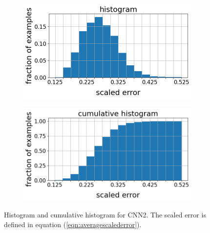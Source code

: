 \documentclass[12pt]{article}
\newcommand{\nhghistowidth}{0.48\linewidth}
\newcommand{\nhghistoheight}{4cm}
\begin{document}
\begin{figure}[!h]
\captionsetup[subfigure]{justification=centering}
  \centering
  \begin{subfigure}[c]{\nhghistowidth}
    \centering
    \includegraphics[totalheight=\nhghistoheight]{Figures/Results2New/histogram_new.png}
  \end{subfigure}
%  
  \begin{subfigure}[c]{\nhghistowidth}
    \centering
    \includegraphics[totalheight=\nhghistoheight]{Figures/Results2New/cumulative_new.png}
  \end{subfigure}
  \caption{\label{fig:cnn2histo} Histogram and cumulative histogram for CNN2. The scaled error is defined in equation (\ref{eqn:averagescalederror}).}
\end{figure}
%
\end{document}
